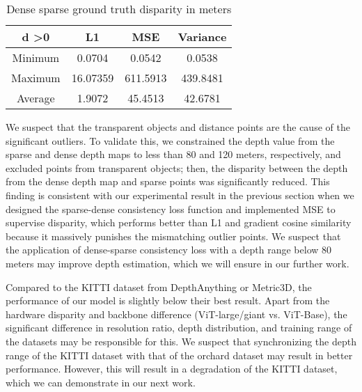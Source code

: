 \documentclass{article}
\begin{document}
    \begin{table}[ht]
        \centering
        \begin{tabular}{c|ccc}
        \hline
             d \textgreater 0 &L1&MSE&Variance\\
        \hline
             Minimum& 0.0704 & 0.0542 & 0.0538\\
             Maximum& 16.07359 & 611.5913 & 439.8481\\
             Average& 1.9072 & 45.4513 & 42.6781\\
        \hline
        \end{tabular}
        \caption{Dense sparse ground truth disparity in meters}
        \label{tab:GT_Disparity_one}
    \end{table}

    We suspect that the transparent objects and distance points are the cause of the significant outliers. To validate this, we constrained the depth value from the sparse and dense depth maps to less than 80 and 120 meters, respectively, and excluded points from transparent objects; then, the disparity between the depth from the dense depth map and sparse points was significantly reduced. This finding is consistent with our experimental result in the previous section when we designed the sparse-dense consistency loss function and implemented MSE to supervise disparity, which performs better than L1 and gradient cosine similarity because it massively punishes the mismatching outlier points. We suspect that the application of dense-sparse consistency loss with a depth range below 80 meters may improve depth estimation, which we will ensure in our further work.

    Compared to the KITTI dataset from DepthAnything or Metric3D, the performance of our model is slightly below their best result. Apart from the hardware disparity and backbone difference (ViT-large/giant vs. ViT-Base), the significant difference in resolution ratio, depth distribution, and training range of the datasets may be responsible for this. We suspect that synchronizing the depth range of the KITTI dataset with that of the orchard dataset may result in better performance. However, this will result in a degradation of the KITTI dataset, which we can demonstrate in our next work.
    
\end{document}
